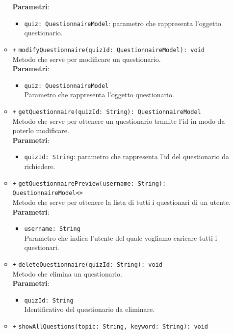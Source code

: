 \begin{itemize}
\begin{itemize}
			\textbf{Parametri}:
			\begin{itemize}
				\item
				\texttt{quiz: QuestionnaireModel}: parametro che rappresenta l'oggetto questionario.
			\end{itemize}
		\item \texttt{+} \texttt{modifyQuestionnaire(quizId: QuestionnaireModel): void} \\ Metodo che serve per modificare un questionario. \\
			\textbf{Parametri}:
			\begin{itemize}
				\item \texttt{quiz: QuestionnaireModel}\\ Parametro che rappresenta l'oggetto questionario.
			\end{itemize}
		\item \texttt{+} \texttt{getQuestionnaire(quizId: String): QuestionnaireModel} \\Metodo che serve per ottenere un questionario tramite l'id in modo da poterlo modificare. \\
			\textbf{Parametri}:
			\begin{itemize}
				\item \texttt{quizId: String}: parametro che rappresenta l'id del questionario da richiedere.
			\end{itemize}
		\item \texttt{+} \texttt{getQuestionnairePreview(username: String): QuestionnaireModel<>} \\ Metodo che serve per ottenere la lista di tutti i questionari di un utente. \\
			\textbf{Parametri}:
			\begin{itemize}
				\item \texttt{username: String}\\ Parametro che indica l'utente del quale vogliamo caricare tutti i questionari.
			\end{itemize}
		\item \texttt{+} \texttt{deleteQuestionnaire(quizId: String): void} \\Metodo che elimina un questionario. \\
		\textbf{Parametri}:
		\begin{itemize}
			\item
			\texttt{quizId: String}\\ Identificativo del questionario da eliminare.
		\end{itemize}
		\item \texttt{+} \texttt{showAllQuestions(topic: String, keyword: String): void} \\

\end{itemize}
\end{itemize}
